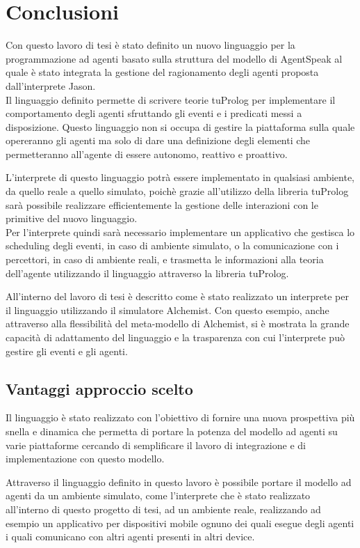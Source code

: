 \chapter{Conclusioni}\label{chap:conclusions}
Con questo lavoro di tesi è stato definito un nuovo linguaggio per la programmazione ad agenti basato sulla struttura del modello di AgentSpeak al quale è stato integrata la gestione del ragionamento degli agenti proposta dall'interprete Jason.
\\
Il linguaggio definito permette di scrivere teorie tuProlog per implementare il comportamento degli agenti sfruttando gli eventi e i predicati messi a disposizione.
Questo linguaggio non si occupa di gestire la piattaforma sulla quale opereranno gli agenti ma solo di dare una definizione degli elementi che permetteranno all'agente di essere autonomo, reattivo e proattivo.

L'interprete di questo linguaggio potrà essere implementato in qualsiasi ambiente, da quello reale a quello simulato, poichè grazie all'utilizzo della libreria tuProlog sarà possibile realizzare efficientemente la gestione delle interazioni con le primitive del nuovo linguaggio.
\\
Per l'interprete quindi sarà necessario implementare un applicativo che gestisca lo scheduling degli eventi, in caso di ambiente simulato, o la comunicazione con i percettori, in caso di ambiente reali, e trasmetta le informazioni alla teoria dell'agente utilizzando il linguaggio attraverso la libreria tuProlog.

All'interno del lavoro di tesi è descritto come è stato realizzato un interprete per il linguaggio utilizzando il simulatore Alchemist.
Con questo esempio, anche attraverso alla flessibilità del meta-modello di Alchemist, si è mostrata la grande capacità di adattamento del linguaggio e la trasparenza con cui l'interprete può gestire gli eventi e gli agenti. 

\section{Vantaggi approccio scelto}
Il linguaggio è stato realizzato con l'obiettivo di fornire una nuova prospettiva più snella e dinamica che permetta di portare la potenza del modello ad agenti su varie piattaforme cercando di semplificare il lavoro di integrazione e di implementazione con questo modello.

Attraverso il linguaggio definito in questo lavoro è possibile portare il modello ad agenti da un ambiente simulato, come l'interprete che è stato realizzato all'interno di questo progetto di tesi, ad un ambiente reale, realizzando ad esempio un applicativo per dispositivi mobile ognuno dei quali esegue degli agenti i quali comunicano con altri agenti presenti in altri device.